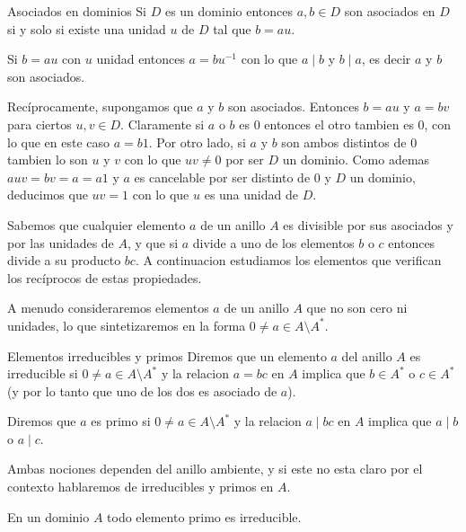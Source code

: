 \begin{lemma}{Asociados en dominios}{}
Si \(D\) es un dominio entonces \(a, b \in D\) son asociados en \(D\) si y solo si existe una unidad \(u\) de \(D\) tal que \(b = au\).
\end{lemma}

\begin{proofbox}
Si \(b = au\) con \(u\) unidad entonces \(a = bu^{-1}\) con lo que \(a \mid b\) y \(b \mid a\), es decir \(a\) y \(b\) son asociados. 

Recíprocamente, supongamos que \(a\) y \(b\) son asociados. Entonces \(b = au\) y \(a = bv\) para ciertos \(u, v \in D\). Claramente si \(a\) o \(b\) es 0 entonces el otro tambien es 0, con lo que en este caso \(a = b1\). Por otro lado, si \(a\) y \(b\) son ambos distintos de 0 tambien lo son \(u\) y \(v\) con lo que \(uv \neq 0\) por ser \(D\) un dominio. Como ademas \(auv = bv = a = a1\) y \(a\) es cancelable por ser distinto de 0 y \(D\) un dominio, deducimos que \(uv = 1\) con lo que \(u\) es una unidad de \(D\).
\end{proofbox}

Sabemos que cualquier elemento \(a\) de un anillo \(A\) es divisible por sus asociados y por las unidades de \(A\), y que si \(a\) divide a uno de los elementos \(b\) o \(c\) entonces divide a su producto \(bc\). A continuacion estudiamos los elementos que verifican los recíprocos de estas propiedades.

A menudo consideraremos elementos \(a\) de un anillo \(A\) que no son cero ni unidades, lo que sintetizaremos en la forma \(0 \neq a \in A \setminus A^*\).

\begin{definition}{Elementos irreducibles y primos}{}
Diremos que un elemento \(a\) del anillo \(A\) es irreducible si \(0 \neq a \in A \setminus A^*\) y la relacion \(a = bc\) en \(A\) implica que \(b \in A^*\) o \(c \in A^*\) (y por lo tanto que uno de los dos es asociado de \(a\)).

Diremos que \(a\) es primo si \(0 \neq a \in A \setminus A^*\) y la relacion \(a \mid bc\) en \(A\) implica que \(a \mid b\) o \(a \mid c\).

Ambas nociones dependen del anillo ambiente, y si este no esta claro por el contexto hablaremos de irreducibles y primos en \(A\).
\end{definition}

\begin{proposition}{}{}
En un dominio \(A\) todo elemento primo es irreducible.
\end{proposition}

